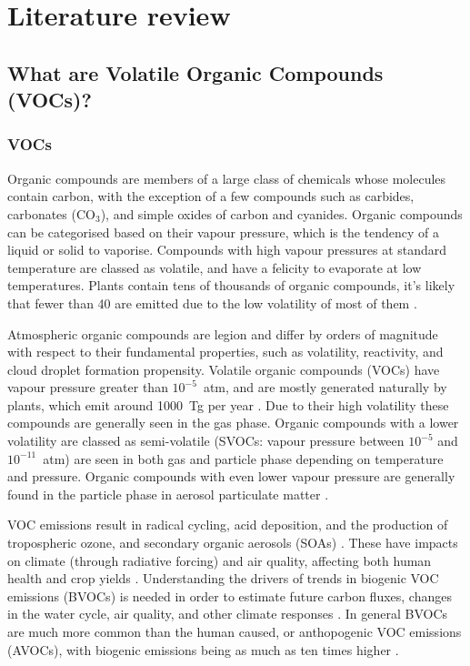 

\chapter{Literature review} %
\label{ch_LitRev}

\section{What are Volatile Organic Compounds (VOCs)?}
\label{ch_LitRev:sec:what_are_vocs}
  \subsection{VOCs}
    Organic compounds are members of a large class of chemicals whose molecules contain carbon, with the exception of a few compounds such as carbides, carbonates (CO$_3$), and simple oxides of carbon and cyanides.
    Organic compounds can be categorised based on their vapour pressure, which is the tendency of a liquid or solid to vaporise.
    Compounds with high vapour pressures at standard temperature are classed as volatile, and have a felicity to evaporate at low temperatures.
    Plants contain tens of thousands of organic compounds, it's likely that fewer than 40 are emitted due to the low volatility of most of them \citep{Guenther2000}.
    
    Atmospheric organic compounds are legion and differ by orders of magnitude with respect to their fundamental properties, such as volatility, reactivity, and cloud droplet formation propensity.
    Volatile organic compounds (VOCs) have vapour pressure greater than $10^{-5}$~atm, and are mostly generated naturally by plants, which emit around 1000~Tg per year \citep{Guenther1995, Glasius2016}.
    Due to their high volatility these compounds are generally seen in the gas phase.
    Organic compounds with a lower volatility are classed as semi-volatile (SVOCs: vapour pressure between $10^{-5}$ and $10^{-11}$~atm) are seen in both gas and particle phase depending on temperature and pressure.
    Organic compounds with even lower vapour pressure are generally found in the particle phase in aerosol particulate matter \citep{Glasius2016}.

    VOC emissions result in radical cycling, acid deposition, and the production of tropospheric ozone, and secondary organic aerosols (SOAs) \citep{Atkinson2000, Kanakidou2005}.
    These have impacts on climate (through radiative forcing) and air quality, affecting both human health and crop yields \citep{IPCC_Chapter2, Avnery2011, Lelieveld2015}.
    Understanding the drivers of trends in biogenic VOC emissions (BVOCs) is needed in order to estimate future carbon fluxes, changes in the water cycle, air quality, and other climate responses \citep{Yue2015}.
    In general BVOCs are much more common than the human caused, or anthopogenic VOC emissions (AVOCs), with biogenic emissions being as much as ten times higher \citep{Kanakidou2005}.
    
